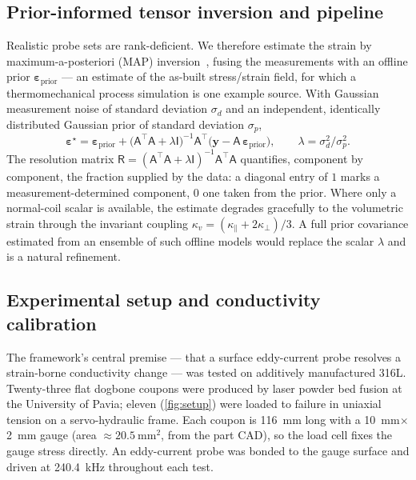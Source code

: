 \documentclass[preprint]{elsarticle}
\newcommand{\eps}{\bm{\varepsilon}}
\begin{document}
\subsection{Prior-informed tensor inversion and pipeline}\label{sec:inv}
Realistic probe sets are rank-deficient. We therefore estimate the strain by
maximum-a-posteriori (MAP) inversion~\cite{aster2018}, fusing the measurements
with an offline prior $\eps_{\mathrm{prior}}$ --- an estimate of the as-built
stress/strain field, for which a thermomechanical process simulation is one
example source. With Gaussian
measurement noise of standard deviation $\sigma_d$ and an independent,
identically distributed Gaussian prior of standard deviation $\sigma_p$,
\begin{equation}
  \eps^\star = \eps_{\mathrm{prior}}
  + \big(\mathsf A^{\!\top}\mathsf A + \lambda \mathsf I\big)^{-1}
  \mathsf A^{\!\top}\big(\bm y - \mathsf A\,\eps_{\mathrm{prior}}\big),
  \qquad \lambda=\sigma_d^2/\sigma_p^2 .
  \label{eq:map}
\end{equation}
The resolution matrix
$\mathsf R=(\mathsf A^{\!\top}\mathsf A+\lambda\mathsf I)^{-1}
\mathsf A^{\!\top}\mathsf A$ quantifies, component by component, the fraction
supplied by the data: a diagonal entry of $1$ marks a measurement-determined
component, $0$ one taken from the prior. Where only a normal-coil scalar is
available, the estimate degrades gracefully to the volumetric strain through
the invariant coupling $\kappa_v=(\kappa_\parallel+2\kappa_\perp)/3$. A full
prior covariance estimated from an ensemble of such offline models would
replace the scalar $\lambda$ and is a natural refinement.


\subsection{Experimental setup and conductivity calibration}\label{sec:experiment}
The framework's central premise --- that a surface eddy-current probe resolves a
strain-borne conductivity change --- was tested on additively manufactured 316L.
Twenty-three flat dogbone coupons were produced by laser powder bed fusion at the
University of Pavia; eleven (\cref{fig:setup}) were loaded to failure in uniaxial
tension on a servo-hydraulic frame. Each coupon is \SI{116}{\milli\metre} long
with a \SI{10}{\milli\metre}$\times$\SI{2}{\milli\metre} gauge (area
${\approx}\SI{20.5}{\milli\metre\squared}$, from the part CAD), so the load cell
fixes the gauge stress directly. An eddy-current probe was bonded to the gauge
surface and driven at \SI{240.4}{\kilo\hertz} throughout each test.
\end{document}
